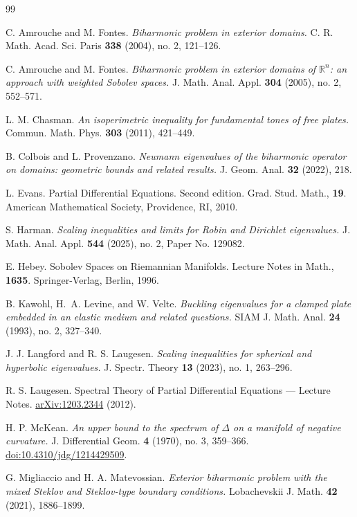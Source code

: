 \documentclass[11pt]{amsart}
\theoremstyle{definition}
\numberwithin{equation}{section}
\begin{document}
\begin{thebibliography}{99}

C. Amrouche and M. Fontes.
\emph{Biharmonic problem in exterior domains.}
C. R. Math. Acad. Sci. Paris \textbf{338} (2004), no. 2, 121--126.

C. Amrouche and M. Fontes.
\emph{Biharmonic problem in exterior domains of ${\mathbb R}^n$: an approach with weighted Sobolev spaces.}
J. Math. Anal. Appl. \textbf{304} (2005), no. 2, 552--571.

L. M. Chasman.
\emph{An isoperimetric inequality for fundamental tones of free plates.}
Commun. Math. Phys. \textbf{303} (2011), 421--449.

B. Colbois and L. Provenzano.
\emph{Neumann eigenvalues of the biharmonic operator on domains: geometric bounds and related results.}
J. Geom. Anal. \textbf{32} (2022), 218.

L. Evans.
Partial Differential Equations.
Second edition.
Grad. Stud. Math., \textbf{19}.
American Mathematical Society, Providence, RI, 2010.

S. Harman.
\emph{Scaling inequalities and limits for Robin and Dirichlet eigenvalues.}
J. Math. Anal. Appl. \textbf{544} (2025), no. 2, Paper No. 129082.

E. Hebey.
Sobolev Spaces on Riemannian Manifolds.
Lecture Notes in Math., \textbf{1635}.
Springer-Verlag, Berlin, 1996.

B. Kawohl, H.~A. Levine, and W. Velte.
\emph{Buckling eigenvalues for a clamped plate embedded in an elastic medium and related questions.}
SIAM J. Math. Anal. \textbf{24} (1993), no. 2, 327--340.

J. J. Langford and R. S. Laugesen.
\emph{Scaling inequalities for spherical and hyperbolic eigenvalues.}
J. Spectr. Theory \textbf{13} (2023), no. 1, 263--296.

R. S. Laugesen.
Spectral Theory of Partial Differential Equations --- Lecture Notes.
\href{https://arxiv.org/abs/1203.2344}{arXiv:1203.2344} (2012).

H. P. McKean.
\emph{An upper bound to the spectrum of $\Delta$ on a manifold of negative curvature.}
J. Differential Geom. \textbf{4} (1970), no. 3, 359--366.
\href{https://doi.org/10.4310/jdg/1214429509}{doi:10.4310/jdg/1214429509}.

G. Migliaccio and H. A. Matevossian.
\emph{Exterior biharmonic problem with the mixed Steklov and Steklov-type boundary conditions.}
Lobachevskii J. Math. \textbf{42} (2021), 1886--1899.


\end{thebibliography}
\end{document}
